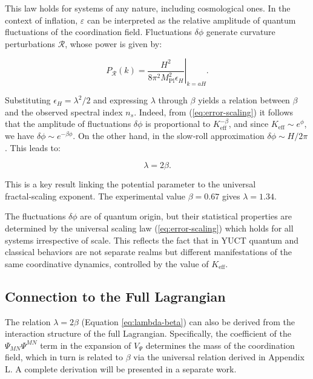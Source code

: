 \documentclass[12pt]{article}
\theoremstyle{remark}
\newcommand{\Keff}{K_{\mathrm{eff}}}
\newcommand{\eps}{\varepsilon}
\newcommand{\Mpl}{M_{\mathrm{Pl}}}
\begin{document}
	This law holds for systems of any nature, including cosmological ones. In the context of inflation, $\eps$ can be interpreted as the relative amplitude of quantum fluctuations of the coordination field. Fluctuations $\delta \phi$ generate curvature perturbations $\mathcal{R}$, whose power is given by:
	
	\begin{equation}
		P_{\mathcal{R}}(k) = \left. \frac{H^2}{8\pi^2 \Mpl^2 \epsilon_H} \right|_{k=aH}.
	\end{equation}
	
	Substituting $\epsilon_H = \lambda^2/2$ and expressing $\lambda$ through $\beta$ yields a relation between $\beta$ and the observed spectral index $n_s$. Indeed, from (\ref{eq:error-scaling}) it follows that the amplitude of fluctuations $\delta \phi$ is proportional to $\Keff^{-\beta}$, and since $\Keff \sim e^{\phi}$, we have $\delta \phi \sim e^{-\beta \phi}$. On the other hand, in the slow‑roll approximation $\delta \phi \sim H/2\pi$. This leads to:
	
	\begin{equation}
		\lambda = 2\beta.
		\label{eq:lambda-beta}
	\end{equation}
	
	This is a key result linking the potential parameter to the universal fractal‑scaling exponent. The experimental value $\beta = 0.67$ gives $\lambda = 1.34$.
	
	The fluctuations $\delta\phi$ are of quantum origin, but their statistical properties are determined by the universal scaling law (\ref{eq:error-scaling}) which holds for all systems irrespective of scale. This reflects the fact that in YUCT quantum and classical behaviors are not separate realms but different manifestations of the same coordinative dynamics, controlled by the value of $K_{\mathrm{eff}}$.
	
	\subsection{Connection to the Full Lagrangian}
	
	The relation $\lambda = 2\beta$ (Equation \ref{eq:lambda-beta}) can also be derived from the interaction structure of the full Lagrangian. Specifically, the coefficient of the $\Psi_{MN}\Psi^{MN}$ term in the expansion of $V_{\Psi}$ determines the mass of the coordination field, which in turn is related to $\beta$ via the universal relation derived in Appendix L. A complete derivation will be presented in a separate work.
	
\end{document}

